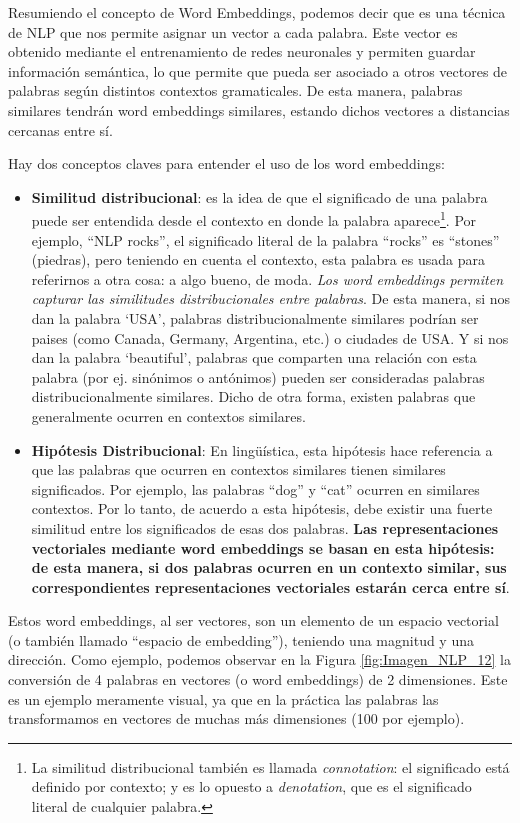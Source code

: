\documentclass[12pt,a4paper]{article}
\begin{document}
\begin{sloppypar}
Resumiendo el concepto de Word Embeddings, podemos decir que es una técnica de NLP que nos permite asignar un vector a cada palabra. Este vector es obtenido mediante el entrenamiento de redes neuronales y permiten guardar información semántica, lo que permite que pueda ser asociado a otros vectores de palabras según distintos contextos gramaticales. De esta manera, palabras similares tendrán word embeddings similares, estando dichos vectores a distancias cercanas entre sí.

Hay dos conceptos claves para entender el uso de los word embeddings:
\begin{itemize}
\item \textbf{Similitud distribucional}\cite{NLP_26}: es la idea de que el significado de una palabra puede ser entendida desde el contexto en donde la palabra aparece\footnote{La similitud distribucional también es llamada \textit{connotation}: el significado está definido por contexto; y es lo opuesto a \textit{denotation}, que es el significado literal de cualquier palabra.}. Por ejemplo, “NLP rocks”, el significado literal de la palabra “rocks” es “stones” (piedras), pero teniendo en cuenta el contexto, esta palabra es usada para referirnos a otra cosa: a algo bueno, de moda.  \textit{Los word embeddings permiten capturar las similitudes distribucionales entre palabras}.  De esta manera, si nos dan la palabra ‘USA’, palabras distribucionalmente similares podrían ser paises (como Canada, Germany, Argentina, etc.) o ciudades de USA. Y si nos dan la palabra ‘beautiful’, palabras que comparten una relación con esta palabra (por ej. sinónimos o antónimos) pueden ser consideradas palabras distribucionalmente similares. Dicho de otra forma, existen palabras que generalmente ocurren en contextos similares.
\item \textbf{Hipótesis Distribucional}\cite{NLP_26}: En lingüística, esta hipótesis hace referencia a que las palabras que ocurren en contextos similares tienen similares significados. Por ejemplo, las palabras “dog” y “cat” ocurren en similares contextos. Por lo tanto, de acuerdo a esta hipótesis, debe existir una fuerte similitud entre los significados de esas dos palabras. \textbf{Las representaciones vectoriales mediante word embeddings se basan en esta hipótesis: de esta manera, si dos palabras ocurren en un contexto similar, sus correspondientes representaciones vectoriales estarán cerca entre sí}.  

\end{itemize}

Estos word embeddings, al ser vectores, son un elemento de un espacio vectorial (o también llamado “espacio de embedding”), teniendo una magnitud y una dirección. Como ejemplo, podemos observar en la Figura \ref{fig:Imagen_NLP_12} la conversión de 4 palabras en vectores (o word embeddings) de 2 dimensiones. Este es un ejemplo meramente visual, ya que en la práctica las palabras las transformamos en vectores de muchas más dimensiones (100 por ejemplo). 


\end{sloppypar}
\end{document}
